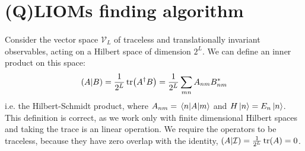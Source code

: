 \section{(Q)LIOMs finding algorithm \label{sec:algorithm}}
  \paragraph{}Consider the vector space \(\mathcal{V}_L\) of traceless and translationally invariant
  observables, acting on a Hilbert space of dimension \(2^L\). We can define an inner product on this space:
  \begin{equation}
      \left(A|B\right) = \frac{1}{2^L}\tr(A^{\dagger}B) = \frac{1}{2^L} \sum_{mn} A_{nm}B_{nm}^{\ast}
  \end{equation}
  i.e. the Hilbert-Schmidt product, where \(A_{nm} = \matrixel{n}{A}{m}\) and \(H\ket{n} = E_n \ket{n}\). 
  This definition is correct, as we work only with finite dimensional Hilbert spaces and taking the trace is an
  linear operation. We require the operators to be traceless, because they have zero overlap with the identity, \(\left(A|\mathcal{I}\right)=\frac{1}{2^L}\tr(A) = 0\).
  
